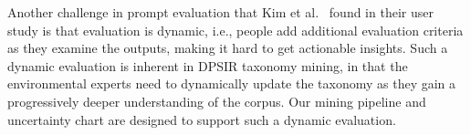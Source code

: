Another challenge in prompt evaluation that Kim et al.~\cite{kim2024evallm} found in their user study is that evaluation is dynamic, i.e., people add additional evaluation criteria as they examine the outputs, making it hard to get actionable insights. Such a dynamic evaluation is inherent in DPSIR taxonomy mining, in that the environmental experts need to dynamically update the taxonomy as they gain a progressively deeper understanding of the corpus.
Our mining pipeline and uncertainty chart are designed to support such a dynamic evaluation.

